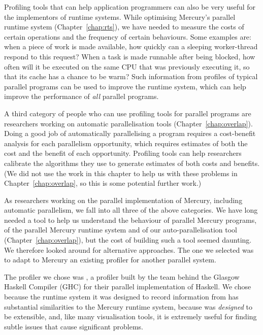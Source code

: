 Profiling tools that can help application programmers
can also be very useful for the implementors of runtime systems.
While optimising Mercury's parallel runtime system (Chapter~\ref{chap:rts}),
we have needed to measure the costs of certain operations
and the frequency of certain behaviours.
Some examples are:
when a piece of work is made available,
how quickly can a sleeping worker-thread respond to this request?
When a task is made runnable after being blocked,
how often will it be executed on the same CPU that was previously executing it,
so that its cache has a chance to be warm?
Such information from profiles of typical parallel programs
can be used to improve the runtime system,
which can help improve the performance of \emph{all} parallel programs.

A third category of people who can use profiling tools for parallel programs
are researchers working on automatic parallelisation tools
(Chapter~\ref{chap:overlap}).
Doing a good job of automatically parallelising a program
requires a cost-benefit analysis for each parallelism opportunity,
which requires estimates of both the cost and the benefit of each opportunity.
Profiling tools can help researchers calibrate
the algorithms they use to generate estimates of both costs and benefits.
(We did not use the work in this chapter to help us with these problems in
Chapter~\ref{chap:overlap},
so this is some potential further work.)

As researchers working on the parallel implementation of Mercury,
including automatic parallelism,
we fall into all three of the above categories.
We have long needed a tool
to help us understand the behaviour of parallel Mercury programs,
of the parallel Mercury runtime system
and of our auto-parallelisation tool (Chapter~\ref{chap:overlap}),
but the cost of building such a tool seemed daunting.
We therefore looked around for alternative approaches.
The one we selected was to adapt to Mercury
an existing profiler for another parallel system.

The profiler we chose was \tscope \citep{threadscope},
a profiler built by the team behind the Glasgow Haskell Compiler (GHC)
for their parallel implementation of Haskell.
We chose \tscope because
the runtime system it was designed to record information from
has substantial similarities to the Mercury runtime system,
because \tscope was \emph{designed} to be extensible,
and, like many visualisation tools, it is extremely useful
for finding subtle issues that cause significant problems.

